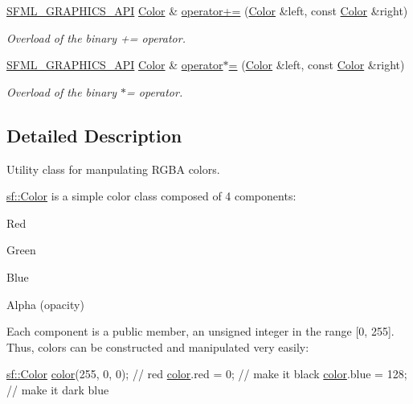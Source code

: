 \begin{DoxyCompactItemize}
\hyperlink{_graphics_2_export_8hpp_ab84c9f1035e146917de3bc0f98d72b35}{S\-F\-M\-L\-\_\-\-G\-R\-A\-P\-H\-I\-C\-S\-\_\-\-A\-P\-I} \hyperlink{classsf_1_1_color}{Color} \& \hyperlink{classsf_1_1_color_a19917f2453a4acfd69de2539bfab8031}{operator+=} (\hyperlink{classsf_1_1_color}{Color} \&left, const \hyperlink{classsf_1_1_color}{Color} \&right)
\begin{DoxyCompactList}\small\item\em Overload of the binary += operator. \end{DoxyCompactList}\item 
\hyperlink{_graphics_2_export_8hpp_ab84c9f1035e146917de3bc0f98d72b35}{S\-F\-M\-L\-\_\-\-G\-R\-A\-P\-H\-I\-C\-S\-\_\-\-A\-P\-I} \hyperlink{classsf_1_1_color}{Color} \& \hyperlink{classsf_1_1_color_a8953be58a47ced92fb25966d6ee90511}{operator$\ast$=} (\hyperlink{classsf_1_1_color}{Color} \&left, const \hyperlink{classsf_1_1_color}{Color} \&right)
\begin{DoxyCompactList}\small\item\em Overload of the binary $\ast$= operator. \end{DoxyCompactList}\end{DoxyCompactItemize}


\subsection{Detailed Description}
Utility class for manpulating R\-G\-B\-A colors. 

\hyperlink{classsf_1_1_color}{sf\-::\-Color} is a simple color class composed of 4 components\-: \begin{DoxyItemize}
\item Red \item Green \item Blue \item Alpha (opacity)\end{DoxyItemize}
Each component is a public member, an unsigned integer in the range \mbox{[}0, 255\mbox{]}. Thus, colors can be constructed and manipulated very easily\-:


\begin{DoxyCode}
\hyperlink{classsf_1_1_color}{sf::Color} \hyperlink{gl3_8h_a3ea846f998d64f079b86052b6c4193a8}{color}(255, 0, 0); \textcolor{comment}{// red}
\hyperlink{gl3_8h_a3ea846f998d64f079b86052b6c4193a8}{color}.red = 0;              \textcolor{comment}{// make it black}
\hyperlink{gl3_8h_a3ea846f998d64f079b86052b6c4193a8}{color}.blue = 128;           \textcolor{comment}{// make it dark blue}
\end{DoxyCode}


